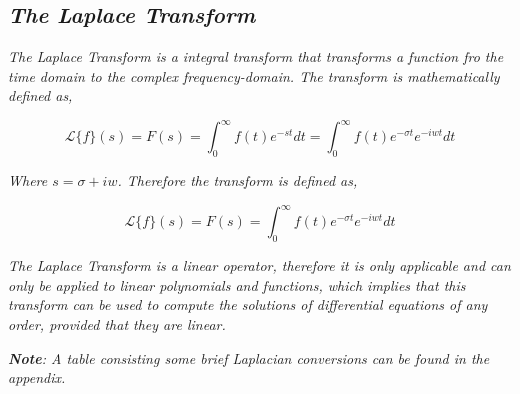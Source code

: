 

\subsection{\textit{The Laplace Transform}}

	\textit{The Laplace Transform is a integral transform that transforms a function fro the time domain to the complex frequency-domain. The transform is mathematically defined as,}

		$$\mathcal{L}\{f\}(s) = F(s) = \int_0^{\infty}f(t)e^{-st} dt = \int_0^{\infty}f(t)e^{-\sigma t}e^{-iwt} dt$$

	\textit{Where $s = \sigma + iw$. Therefore the transform is defined as,}
	
		$$\mathcal{L}\{f\}(s) = F(s) = \int_0^{\infty}f(t)e^{-\sigma t}e^{-iwt} dt$$
	
	\textit{The Laplace Transform is a linear operator, therefore it is only applicable and can only be applied to linear polynomials and functions, which implies that this transform can be used to compute the solutions of differential equations of any order, provided that they are linear.}
	
	\textit{\textbf{Note}: A table consisting some brief Laplacian conversions can be found in the appendix.}	
	
	
	
